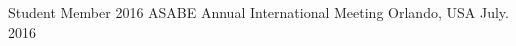 
\begin{cvconferences}
\cvconference
{Student Member} %
{2016 ASABE Annual International Meeting} %
{Orlando, USA} %
{July. 2016} %
\end{cvconferences}